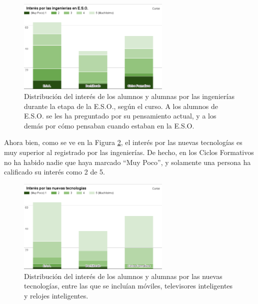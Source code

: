 \documentclass[runningheads,a4paper]{llncs}
\begin{document}
\begin{figure}
  \begin{center}
    \includegraphics[width=0.65\textwidth]{Bitmap/interes.png}
    \caption{{\scriptsize Distribución del interés de los alumnos y alumnas por las ingenierías durante la etapa de la E.S.O., según el curso. A los alumnos de E.S.O. se les ha preguntado por su pensamiento actual, y a los demás por cómo pensaban cuando estaban en la E.S.O.}}
    \label{fig:interes}
  \end{center}
\end{figure}

Ahora bien, como se ve en la Figura \ref{fig:interes_tech}, el interés por las nuevas tecnologías es muy superior al registrado por las ingenierías. De hecho, en los Ciclos Formativos no ha habido nadie que haya marcado ``Muy Poco'', y solamente una persona ha calificado su interés como 2 de 5.

\begin{figure}
  \begin{center}
    \includegraphics[width=0.65\textwidth]{Bitmap/interes_tech.png}
    \caption{{\scriptsize Distribución del interés de los alumnos y alumnas por las nuevas tecnologías, entre las que se incluían móviles, televisores inteligentes y relojes inteligentes.}}
    \label{fig:interes_tech}
  \end{center}
\end{figure}
\end{document}
